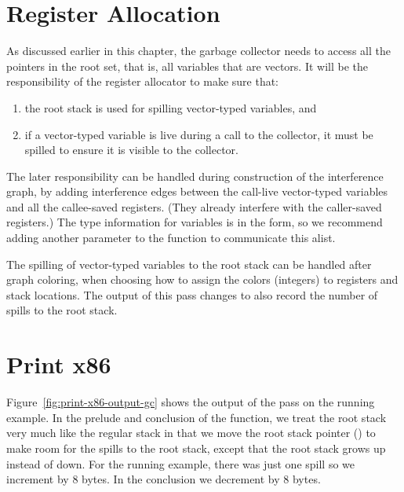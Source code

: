 \documentclass[11pt]{book}
\begin{document}
\clearpage

\section{Register Allocation}
\label{sec:reg-alloc-gc}

As discussed earlier in this chapter, the garbage collector needs to
access all the pointers in the root set, that is, all variables that
are vectors. It will be the responsibility of the register allocator
to make sure that:
\begin{enumerate}
\item the root stack is used for spilling vector-typed variables, and
\item if a vector-typed variable is live during a call to the
  collector, it must be spilled to ensure it is visible to the
  collector.
\end{enumerate}

The later responsibility can be handled during construction of the
interference graph, by adding interference edges between the call-live
vector-typed variables and all the callee-saved registers. (They
already interfere with the caller-saved registers.)  The type
information for variables is in the  form, so we
recommend adding another parameter to the 
function to communicate this alist.

The spilling of vector-typed variables to the root stack can be
handled after graph coloring, when choosing how to assign the colors
(integers) to registers and stack locations. The  output
of this pass changes to also record the number of spills to the root
stack.

%





\section{Print x86}
\label{sec:print-x86-gc}

Figure~\ref{fig:print-x86-output-gc} shows the output of the
 pass on the running example. In the prelude and
conclusion of the  function, we treat the root stack very
much like the regular stack in that we move the root stack pointer
() to make room for the spills to the root stack, except
that the root stack grows up instead of down.  For the running
example, there was just one spill so we increment  by 8
bytes. In the conclusion we decrement  by 8 bytes.
\end{document}

